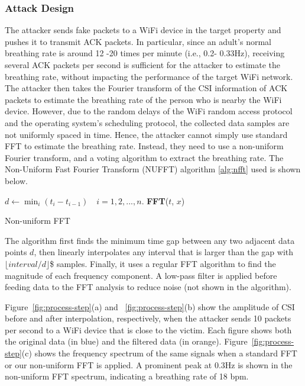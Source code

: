\subsubsection{Attack Design}
The attacker sends fake packets to a WiFi device in the target property and pushes it to transmit ACK packets. In particular, since an adult’s normal breathing rate is around 12 -20
times per minute (i.e., 0.2- 0.33Hz), receiving several ACK packets per second is sufficient for the attacker to estimate the breathing rate, without impacting the performance of the target WiFi network. The attacker then takes the Fourier transform of the CSI information of ACK packets to estimate the breathing rate of the person who is nearby the WiFi device. However, due to the random delays of the WiFi random access protocol and the operating
system’s scheduling protocol, the collected data samples are not uniformly spaced in time. Hence, the attacker cannot simply use standard FFT to estimate the breathing rate. Instead, they need to use a non-uniform Fourier transform, and a voting algorithm to extract the breathing rate. The  Non-Uniform Fast Fourier Transform (NUFFT) algorithm \ref{alg:nfft}  used is shown below.

\begin{algorithm}
\SetAlgoLined
{}
 $d \leftarrow \min_i({t_i - t_{i - 1}}) \quad i = 1, 2, ..., n.$\;
 \Return \textbf{FFT}($t$, $x$)
 \caption{Non-uniform FFT}
 \label{alg:nfft}
\end{algorithm}

The algorithm first finds the minimum time gap between any two adjacent data points $d$, then linearly interpolates any interval that is larger than the gap with $\lfloor interval / d \rfloor$\$ samples. Finally, it uses a regular FFT algorithm to find the magnitude of each frequency component. A low-pass filter is applied before feeding data to the FFT analysis to reduce noise (not shown in the algorithm).



Figure~\ref {fig:process-step}(a) and ~\ref{fig:process-step}(b) show the amplitude of CSI before and after interpolation, respectively, when the attacker sends 10 packets per second to a WiFi device that is close to the victim. Each figure shows both the original data (in blue) and the filtered data (in orange). Figure~\ref{fig:process-step}(c) shows the frequency spectrum of the same signals when a standard FFT or our non-uniform FFT is applied. A prominent peak at 0.3Hz is shown in the non-uniform FFT spectrum, indicating a breathing rate of 18 bpm.

